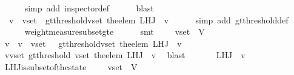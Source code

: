 \begin{isabellebody}
\ \ \ \ \isamarkupfalse%
\ {\isacharparenleft}simp\ add{\isacharcolon}\ inspector{\isacharunderscore}def{\isacharparenright}\isanewline
\ \ \ \ \isamarkupfalse%
\ blast\isanewline
\ \ \isamarkupfalse%
\ {\isachardoublequoteopen}{\isasymexists}\ v\ {\isasymin}\ v{\isacharunderscore}set{\isachardot}\ \ gt{\isacharunderscore}threshold{\isacharparenleft}v{\isacharunderscore}set{\isacharcomma}\ the{\isacharunderscore}elem\ {\isacharparenleft}L{\isacharunderscore}H{\isacharunderscore}J\ {\isasymsigma}\ v{\isacharparenright}{\isacharparenright}{\isachardoublequoteclose}\isanewline
\ \ \ \ \isamarkupfalse%
\ {\isacharparenleft}simp\ add{\isacharcolon}\ gt{\isacharunderscore}threshold{\isacharunderscore}def{\isacharparenright}\isanewline
\ \ \ \ \isamarkupfalse%
\ weight{\isacharunderscore}measure{\isacharunderscore}subset{\isacharunderscore}gte\isanewline
\ \ \ \ \isamarkupfalse%
\ {\isacharparenleft}smt\ {\isacartoucheopen}{\isasymsigma}\ {\isasymin}\ {\isasymSigma}\ {\isasymand}\ v{\isacharunderscore}set\ {\isasymsubseteq}\ V{\isacartoucheclose}{\isacharparenright}\ \isanewline
\ \ \isamarkupfalse%
\ v\ \ {\isachardoublequoteopen}v\ {\isasymin}\ v{\isacharunderscore}set\ {\isasymand}\ \ gt{\isacharunderscore}threshold{\isacharparenleft}v{\isacharunderscore}set{\isacharcomma}\ the{\isacharunderscore}elem\ {\isacharparenleft}L{\isacharunderscore}H{\isacharunderscore}J\ {\isasymsigma}\ v{\isacharparenright}{\isacharparenright}{\isachardoublequoteclose}\isanewline
\ \ \ \ \isamarkupfalse%
\ {\isacartoucheopen}{\isasymexists}v{\isasymin}v{\isacharunderscore}set{\isachardot}\ gt{\isacharunderscore}threshold\ {\isacharparenleft}v{\isacharunderscore}set{\isacharcomma}\ the{\isacharunderscore}elem\ {\isacharparenleft}L{\isacharunderscore}H{\isacharunderscore}J\ {\isasymsigma}\ v{\isacharparenright}{\isacharparenright}{\isacartoucheclose}\ \isamarkupfalse%
\ blast\isanewline
\ \ \isamarkupfalse%
\ {\isachardoublequoteopen}{\isasymforall}\ {\isasymsigma}{\isacharprime}\ {\isasymin}\ L{\isacharunderscore}H{\isacharunderscore}J\ {\isasymsigma}\ v{\isachardot}\ {\isasymsigma}{\isacharprime}\ {\isasymsubseteq}\ {\isasymsigma}{\isachardoublequoteclose}\isanewline
\ \ \ \ \isamarkupfalse%
\ L{\isacharunderscore}H{\isacharunderscore}J{\isacharunderscore}is{\isacharunderscore}subset{\isacharunderscore}of{\isacharunderscore}the{\isacharunderscore}state\ {\isacartoucheopen}{\isasymsigma}\ {\isasymin}\ {\isasymSigma}\ {\isasymand}\ v{\isacharunderscore}set\ {\isasymsubseteq}\ V{\isacartoucheclose}\isanewline

\end{isabellebody}
